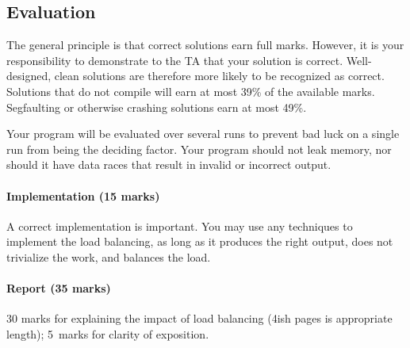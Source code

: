 \documentclass[letterpaper,10pt]{article}
\begin{document}
\subsection{Evaluation}

The general principle is that correct solutions earn full marks.
However, it is your responsibility to demonstrate to the TA
that your solution is correct. Well-designed, clean solutions 
are therefore more likely to be recognized as correct. Solutions that do not compile will earn at most 39\% of the available
marks. Segfaulting or otherwise crashing solutions earn
at most 49\%.

Your program will be evaluated over several runs to prevent bad luck on a single run from being the deciding factor. Your program should not leak memory, nor should it have data races that result in invalid or incorrect output. 


\paragraph{Implementation (15 marks)} A correct implementation is important. You may use any techniques to implement the load balancing, as long as it produces the right output, does not trivialize the work, and balances the load.



\paragraph{Report (35 marks)} 30 marks for explaining the impact of load balancing (4ish pages is appropriate length); 5~marks for clarity of exposition.
\end{document}
